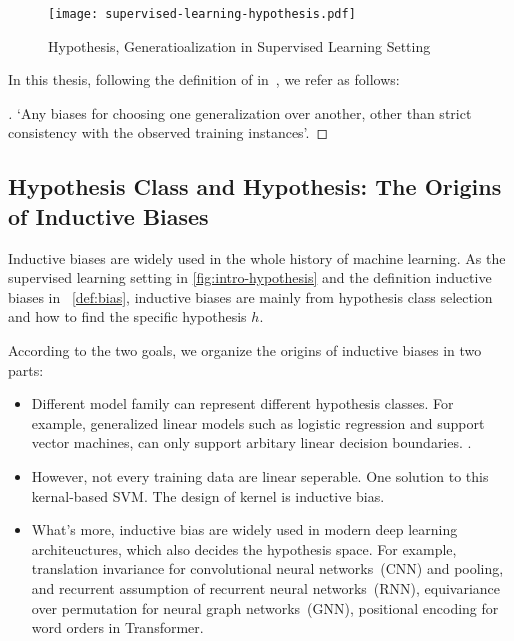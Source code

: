 \begin{figure}[!th]
\centering
\texttt{[image: supervised-learning-hypothesis.pdf]}
\caption{\label{fig:intro-hypothesis}Hypothesis, Generatioalization in
  Supervised Learning Setting}
\end{figure}

In this thesis, following the definition of 
in~\cite{mitchell1980need}, we refer  as follows:

\begin{proof}[]
  \label{def:bias}
  `Any biases for choosing one generalization over another, other than
  strict consistency with the observed training instances'.
\end{proof}

\subsection{Hypothesis Class and Hypothesis: The Origins of Inductive Biases}
\label{ssec:intro:bias-source}
Inductive biases are widely used in the whole history of machine
learning. As the supervised learning setting in
\autoref{fig:intro-hypothesis} and the definition inductive biases in
~\autoref{def:bias}, inductive biases are mainly from hypothesis class
selection and how to find the specific hypothesis $h$.

According to the two goals, we organize the origins of inductive
biases in two parts:


\begin{itemize}
\item {} Different model family can represent different
  hypothesis classes. For example, generalized linear models such as
  logistic regression and support vector machines, can only support
  arbitary linear decision boundaries. .


\item {}  However, not
  every training data are linear seperable. One solution to this
  kernal-based SVM. The design of kernel is inductive bias.

\item {} What's
  more, inductive bias are widely used in modern deep learning
  architeuctures, which also decides the hypothesis space.  For
  example, translation invariance for convolutional neural
  networks~(CNN) and pooling, and recurrent assumption of recurrent
  neural networks~(RNN), equivariance over permutation for neural
  graph networks~(GNN), positional encoding for word orders in
  Transformer.  
\end{itemize}

